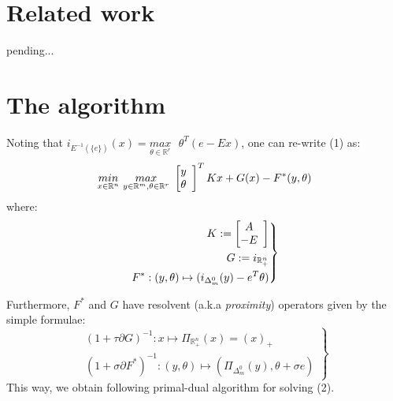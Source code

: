 \documentclass[a4paper,10pt,journal]{IEEEtran}
\begin{document}
\section{Related work}
pending...

\section{The algorithm}
Noting that $i_{E^{-1}(\{e\})}(x) = \underset{\theta \in \mathbb{R}^r}{max}\text{ }\theta^T(e - Ex)$, one can re-write (1) as:
\begin{equation}
  \underset{x \in \mathbb{R}^n}{min}\text{ }\underset{y \in \mathbb{R}^m, \theta \in \mathbb{R}^r}{max}\text{ }
  \left[\begin{array}{@{}cc@{}}y\\\theta\end{array}\right]^TKx + G(x) - F^*(y, \theta)
\end{equation}
where:
\begin{equation}
  \left.
  \begin{aligned}
    K := \left[\begin{array}{@{}cc@{}}A\\-E\end{array}\right]\\
    G:=i_{\mathbb{R}_{+}^n}\\
    F^*: (y, \theta) \mapsto (i_{\Delta_{m}^0}(y) - e^T\theta)
  \end{aligned}
  \right\}
\end{equation}

Furthermore, $F^*$ and $G$ have resolvent (a.k.a \textit{proximity}) operators given by the simple formulae:
\begin{equation}
  \left.
  \begin{aligned}
    (1 + \tau \partial G)^{-1}: x \mapsto \Pi_{\mathbb{R}_{+}^n}(x) = (x)_+\\
    (1 + \sigma \partial F^*)^{-1}: (y, \theta) \mapsto (\Pi_{\Delta_{m}^0}(y), \theta + \sigma e)%
  \end{aligned}
  \right\}
\end{equation}
This way, we obtain following primal-dual algorithm for solving (2).
\end{document}
